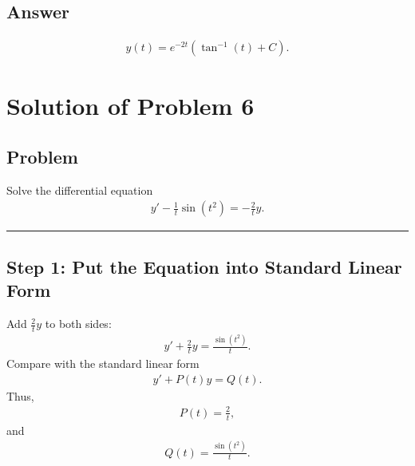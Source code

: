 \documentclass[letterpaper,10pt,english]{sphinxmanual}
\begin{document}
\subsection{Answer}
\label{\detokenize{Language/Science_language/ODE_calculus/course_MATH_3035/homework_assignments/index_pdf:answer}}\begin{equation*}
\begin{split}\boxed{
y(t)
=
e^{-2t}\left(\tan^{-1}(t)+C\right)
}.\end{split}
\end{equation*}



\section{Solution of Problem 6}
\label{\detokenize{Language/Science_language/ODE_calculus/course_MATH_3035/homework_assignments/index_pdf:solution-of-problem-6}}

\subsection{Problem}
\label{\detokenize{Language/Science_language/ODE_calculus/course_MATH_3035/homework_assignments/index_pdf:id3}}
\sphinxAtStartPar
Solve the differential equation
\begin{equation*}
\begin{split}y' - \frac{1}{t}\sin(t^2) = -\frac{2}{t}y.\end{split}
\end{equation*}

\bigskip\hrule\bigskip



\subsection{Step 1: Put the Equation into Standard Linear Form}
\label{\detokenize{Language/Science_language/ODE_calculus/course_MATH_3035/homework_assignments/index_pdf:step-1-put-the-equation-into-standard-linear-form}}
\sphinxAtStartPar
Add \(\frac{2}{t}y\) to both sides:
\begin{equation*}
\begin{split}y' + \frac{2}{t}y = \frac{\sin(t^2)}{t}.\end{split}
\end{equation*}
\sphinxAtStartPar
Compare with the standard linear form
\begin{equation*}
\begin{split}y' + P(t)y = Q(t).\end{split}
\end{equation*}
\sphinxAtStartPar
Thus,
\begin{equation*}
\begin{split}P(t)=\frac{2}{t},\end{split}
\end{equation*}
\sphinxAtStartPar
and
\begin{equation*}
\begin{split}Q(t)=\frac{\sin(t^2)}{t}.\end{split}
\end{equation*}
\end{document}
